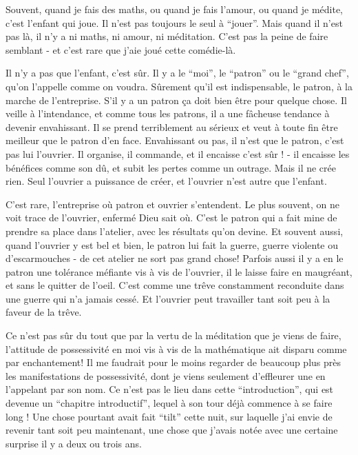 Souvent, quand je fais des maths, ou quand je fais l'amour, ou quand je médite, c'est l'enfant qui joue. Il n'est pas toujours le seul à ``jouer''. Mais quand il n'est pas là, il n'y a ni maths, ni amour, ni méditation. C'est pas la peine de faire semblant - et c'est rare que j'aie joué cette comédie-là.

Il n'y a pas que l'enfant, c'est sûr. Il y a le ``moi'', le ``patron'' ou le ``grand chef'', qu'on l'appelle comme on voudra. Sûrement qu'il est indispensable, le patron, à la marche de l'entreprise. S'il y a un patron ça doit bien être pour quelque chose. Il veille à l'intendance, et comme tous les patrons, il a une fâcheuse tendance à devenir envahissant. Il se prend terriblement au sérieux et veut à toute fin être meilleur que le patron d'en face. Envahissant ou pas, il n'est que le patron, c'est pas lui l'ouvrier. Il organise, il commande, et il encaisse c'est sûr ! - il encaisse les bénéfices comme son dû, et subit les pertes comme un outrage. Mais il ne crée rien. Seul l'ouvrier a puissance de créer, et l'ouvrier n'est autre que l'enfant.

C'est rare, l'entreprise où patron et ouvrier s'entendent. Le plus souvent, on ne voit trace de l'ouvrier, enfermé Dieu sait où. C'est le patron qui a fait mine de prendre sa place dans l'atelier, avec les résultats qu'on devine. Et souvent aussi, quand l'ouvrier y est bel et bien, le patron lui fait la guerre, guerre violente ou d'escarmouches - de cet atelier ne sort pas grand chose! Parfois aussi il y a en le patron une tolérance méfiante vis à vis de l'ouvrier, il le laisse faire en maugréant, et sans le quitter de l'oeil. C'est comme une trêve constamment reconduite dans une guerre qui n'a jamais cessé. Et l'ouvrier peut travailler tant soit peu à la faveur de la trêve.

Ce n'est pas sûr du tout que par la vertu de la méditation que je viens de faire, l'attitude de possessivité en moi vis à vis de la mathématique ait disparu comme par enchantement! Il me faudrait pour le moins regarder de beaucoup plus près les manifestations de possessivité, dont je viens seulement d'effleurer une en l'appelant par son nom. Ce n'est pas le lieu dans cette ``introduction'', qui est devenue un ``chapitre introductif'', lequel à son tour déjà commence à se faire long ! Une chose pourtant avait fait ``tilt'' cette nuit, sur laquelle j'ai envie de revenir tant soit peu maintenant, une chose que j'avais notée avec une certaine surprise il y a deux ou trois ans.

